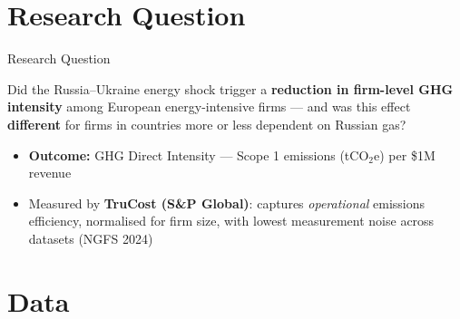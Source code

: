 \documentclass[10pt]{beamer}
\begin{document}
\section{Research Question}

\begin{frame}{Research Question}
  \begin{block}{}
    \normalsize
    Did the Russia--Ukraine energy shock trigger a \textbf{reduction in firm-level GHG intensity}
    among European energy-intensive firms --- and was this effect \textbf{different} for firms
    in countries more or less dependent on Russian gas?
  \end{block}

  \vspace{0.8em}

  \begin{itemize}
    \item \textbf{Outcome:} GHG Direct Intensity --- Scope 1 emissions (tCO$_2$e) per \$1M revenue
    \item Measured by \textbf{TruCost (S\&P Global)}: captures \emph{operational} emissions efficiency,
          normalised for firm size, with lowest measurement noise across datasets (NGFS 2024)
  \end{itemize}
\end{frame}

\section{Data}
\end{document}

